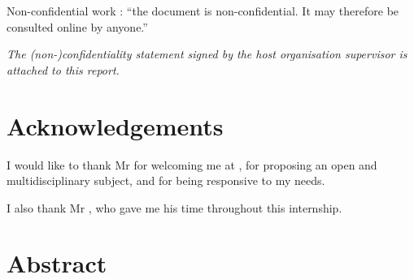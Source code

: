 \noindent
Non-confidential work : ``the document is non-confidential. It may therefore be
consulted online by anyone.''

\vspace{2cm}

\noindent\textit{The (non-)confidentiality statement signed by the host
organisation supervisor is attached to this report.}

\clearpage

\thispagestyle{empty}
\chapter*{Acknowledgements}

\vspace{0.5cm}

\noindent
I would like to thank Mr \hostSupervisor{} for welcoming me at
\hostOrganisation{}, for proposing an open and multidisciplinary subject, and
for being responsive to my needs.

I also thank Mr \enstaSupervisor{}, who gave me his time throughout this
internship.

\clearpage

\chapter*{Abstract}

